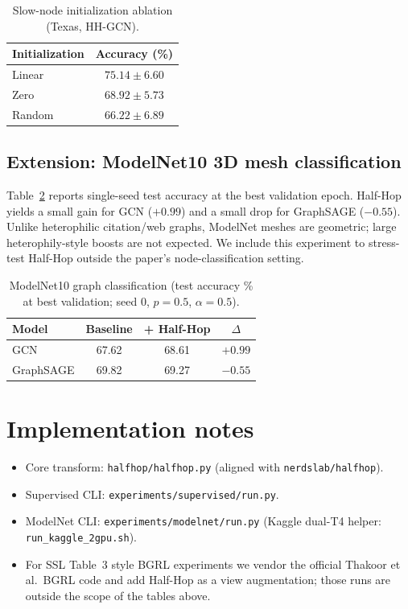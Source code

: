 \documentclass[11pt,a4paper]{article}
\begin{document}
\begin{table}[H]
\centering
\caption{Slow-node initialization ablation (Texas, HH-GCN).}
\label{tab:init}
\begin{tabular}{lc}
\toprule
Initialization & Accuracy (\%) \\
\midrule
Linear & $75.14{\pm}6.60$ \\
Zero & $68.92{\pm}5.73$ \\
Random & $66.22{\pm}6.89$ \\
\bottomrule
\end{tabular}
\end{table}

\subsection{Extension: ModelNet10 3D mesh classification}
Table~\ref{tab:modelnet} reports single-seed test accuracy at the best
validation epoch.
Half-Hop yields a small gain for GCN ($+0.99$) and a small drop for
GraphSAGE ($-0.55$).
Unlike heterophilic citation/web graphs, ModelNet meshes are geometric;
large heterophily-style boosts are not expected.
We include this experiment to stress-test Half-Hop outside the paper's
node-classification setting.

\begin{table}[H]
\centering
\caption{ModelNet10 graph classification (test accuracy \% at best validation;
seed $0$, $p=0.5$, $\alpha=0.5$).}
\label{tab:modelnet}
\begin{tabular}{lccc}
\toprule
Model & Baseline & + Half-Hop & $\Delta$ \\
\midrule
GCN & 67.62 & 68.61 & $+0.99$ \\
GraphSAGE & 69.82 & 69.27 & $-0.55$ \\
\bottomrule
\end{tabular}
\end{table}

\section{Implementation notes}
\begin{itemize}
  \item Core transform: \texttt{halfhop/halfhop.py} (aligned with
        \texttt{nerdslab/halfhop}).
  \item Supervised CLI: \texttt{experiments/supervised/run.py}.
  \item ModelNet CLI: \texttt{experiments/modelnet/run.py}
        (Kaggle dual-T4 helper: \texttt{run\_kaggle\_2gpu.sh}).
  \item For SSL Table~3 style BGRL experiments we vendor the official
        Thakoor et al.\ BGRL code and add Half-Hop as a view augmentation;
        those runs are outside the scope of the tables above.
\end{itemize}
\end{document}
